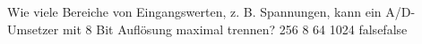     {Wie viele Bereiche von Eingangswerten, z. B. Spannungen, kann ein A/D-Umsetzer mit 8 Bit Auflösung maximal trennen?}
    {256}
    {8}
    {64}
    {1024}
    {false}{false}